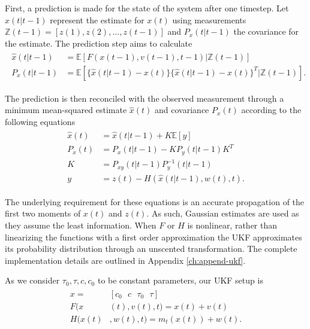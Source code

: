 First, a prediction is made for the state of the system after one timestep. Let $\hat{x}(t\vert t-1)$ represent the estimate for $x(t)$ using measurements $\mathbb{Z}(t-1)=[z(1), z(2), ..., z(t-1)]$ and $P_{x}(t\vert t-1)$ the covariance for the estimate. The prediction step aims to calculate
\begin{align}\begin{split}
  \hat{x}(t\vert t-1) &= \mathbb{E}[F(x(t-1), v(t-1), t-1)\vert \mathbb{Z}(t-1)]\\
  P_{x}(t\vert t-1) &= \mathbb{E}[\{ \hat{x}(t\vert t-1) - x(t) \} \{ \hat{x}(t\vert t-1) - x(t) \}^T \vert \mathbb{Z}(t-1)].
\end{split}\end{align}

The prediction is then reconciled with the observed measurement through a minimum mean-squared estimate $\hat{x}(t)$ and covariance $P_{x}(t)$ according to the following equations
\begin{align}
\begin{split}
  \hat{x}(t) &= \hat{x}(t\vert t-1) + K \mathbb{E}[y] \\
  P_{x}(t) &= P_{x}(t\vert t-1) - KP_{y}(t\vert t-1) K^T\\
  K &= P_{xy}(t\vert t-1) P_{y}^{-1}(t\vert t-1)\\
  y &= z(t) - H(\hat{x}(t\vert t-1) , w(t), t).
\end{split}
\end{align}

The underlying requirement for these equations is an accurate propagation of the first two moments of $x(t)$ and $z(t)$. As such, Gaussian estimates are used as they assume the least information. When $F$ or $H$ is nonlinear, rather than linearizing the functions with a first order approximation the UKF approximates its probability distribution through an unscented transformation. The complete implementation details are outlined in Appendix \ref{ch:append-ukf}.

As we consider $\tau_0, \tau, c, c_0$ to be constant parameters, our UKF setup is
\begin{align}
\begin{split}
  x = &[c_0 \text{ } c \text{ } \tau_0 \text{ } \tau]\\
  F(x&(t), v(t), t) = x(t) + v(t)\\
  H(x(t)&, w(t), t) = m_t(x(t)) + w(t).
\end{split}
\end{align}

